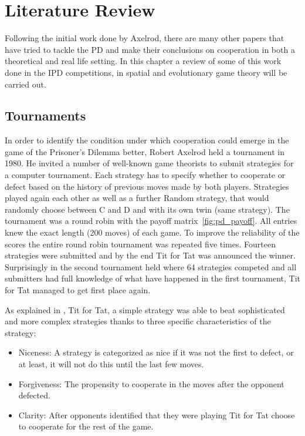 \chapter{Literature Review}
\label{chap:Two}

Following the initial work done by Axelrod, there are many other papers that
have tried to tackle the PD and make their conclusions on cooperation in both a
theoretical and real life setting. In this chapter a review of some of this work
done in the IPD competitions, in spatial and evolutionary game theory will be
carried out.

\section{Tournaments}

In order to identify the condition under which cooperation could emerge
in the game of the Prisoner's Dilemma better, Robert Axelrod held a tournament
in 1980. He invited a number of well-known game theorists to submit strategies
for a computer tournament.  Each strategy has to specify whether to cooperate or
defect based on the history of previous moves made by both players.
Strategies played again
each other as well as a further Random strategy, that would randomly choose
between C and D and with its own twin (same strategy). The tournament was a
round robin with the payoff matrix~\ref{fig:pd_payoff}. All entries knew the
exact length (200 moves) of each game. To improve the reliability of the scores
the entire round robin tournament was repeated five times. Fourteen strategies were
submitted and by the end Tit for Tat was announced the winner. Surprisingly in
the second tournament held where 64 strategies competed and all submitters had
full knowledge of what have happened in the first tournament, Tit for Tat
managed to get first place again\cite{Axelrod1980a}.

As explained in \cite{Axelrod1980b}, Tit for Tat, a simple strategy was
able to beat sophisticated and more complex strategies thanks to three
specific characteristics of the strategy:

\begin{itemize}
  \item Niceness:  A strategy is categorized as nice if it was not the
                    first to defect, or at least, it will not do this until
                    the last few moves.
  \item Forgiveness: The propensity to cooperate in the moves after the
                     opponent defected.
  \item Clarity: After opponents identified that they were playing Tit for Tat
                 choose to cooperate for the rest of the game.
\end{itemize}

